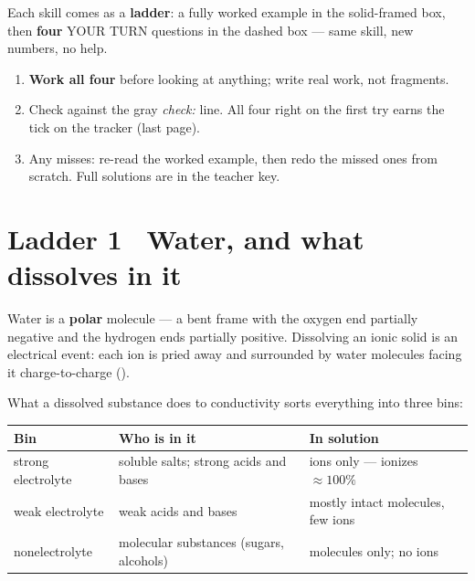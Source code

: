 \documentclass{apchem-worksheet}
\begin{document}
\apctitleblock

\begin{apcnote}
Each skill comes as a \textbf{ladder}: a fully worked example in the
solid-framed box, then \textbf{four} YOUR TURN questions in the dashed
box --- same skill, new numbers, no help.

\begin{enumerate}[leftmargin=*,itemsep=0.15em]
  \item \textbf{Work all four} before looking at anything; write real
        work, not fragments.
  \item Check against the gray \emph{check:} line. All four right on the
        first try earns the tick on the tracker (last page).
  \item Any misses: re-read the worked example, then redo the missed ones
        from scratch. Full solutions are in the teacher key.
\end{enumerate}
\end{apcnote}

\section*{\sffamily Ladder 1 \textbullet\ Water, and what dissolves in it}

Water is a \textbf{polar} molecule --- a bent frame with the oxygen end
partially negative and the hydrogen ends partially positive. Dissolving
an ionic solid is an electrical event: each ion is pried away and
surrounded by water molecules facing it charge-to-charge
().

What a dissolved substance does to conductivity sorts everything into
three bins:

\begin{center}
\renewcommand{\arraystretch}{1.2}
\begin{tabular}{@{}lll@{}}
\hline
\textbf{Bin} & \textbf{Who is in it} & \textbf{In solution} \\
\hline
strong electrolyte & soluble salts; strong acids and bases &
  ions only --- ionizes $\approx 100\%$ \\
weak electrolyte & weak acids and bases &
  mostly intact molecules, few ions \\
nonelectrolyte & molecular substances (sugars, alcohols) &
  molecules only; no ions \\
\hline
\end{tabular}
\end{center}
\end{document}
